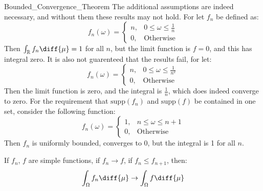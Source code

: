         \begin{lexample}{}{Bounded_Convergence_Theorem}
            The additional assumptions are indeed
            necessary, and without them these results
            may not hold. For let $f_{n}$ be defined as:
            \begin{equation}
                f_{n}(\omega)=
                \begin{cases}
                    n,&0\leq\omega\leq\frac{1}{n}\\
                    0,&\textrm{Otherwise}
                \end{cases}
            \end{equation}
            Then $\int_{\mathbb{R}}f_{n}\diff{\mu}=1$
            for all $n$, but the limit function is
            $f=0$, and this has integral zero. It is
            also not guarenteed that the results
            fail, for let:
            \begin{equation}
                f_{n}(\omega)=
                \begin{cases}
                    n,&0\leq\omega\leq\frac{1}{n^{2}}\\
                    0,&\textrm{Otherwise}
                \end{cases}
            \end{equation}
            Then the limit function is zero, and the
            integral is $\frac{1}{n}$, which does indeed
            converge to zero. For the requirement that
            $\mathrm{supp}(f_{n})$ and $\mathrm{supp}(f)$ be contained in
            one set, consider the following function:
            \begin{equation}
                f_{n}(\omega)=
                \begin{cases}
                    1,&n\leq\omega\leq{n+1}\\
                    0,&\textrm{Otherwise}
                \end{cases}
            \end{equation}
            Then $f_{n}$ is uniformly bounded,
            converges to $0$, but the integral is
            1 for all $n$.
        \end{lexample}
        \begin{theorem}
            If $f_{n}$, $f$ are simple functions, if
            $f_{n}\rightarrow{f}$, if $f_{n}\leq{f}_{n+1}$,
            then:
            \begin{equation}
                \int_{\Omega}f_{n}\diff{\mu}
                \rightarrow\int_{\Omega}f\diff{\mu}
            \end{equation}
        \end{theorem}
